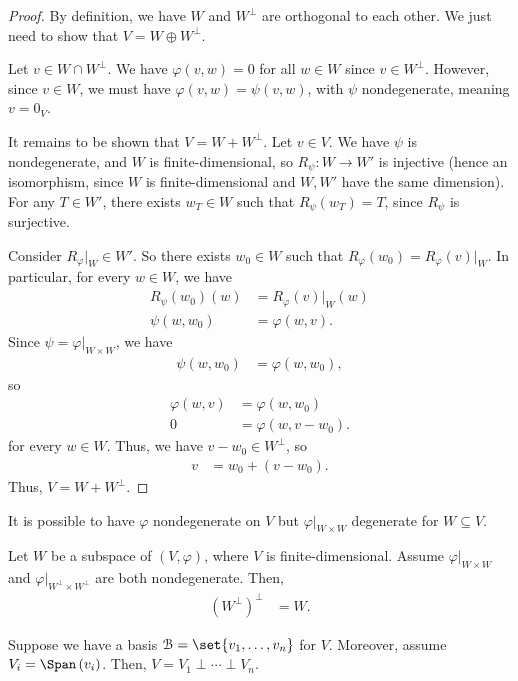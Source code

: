 \documentclass[10pt]{mypackage}
\begin{document}
  \begin{proof}
    By definition, we have $W$ and $W^{\perp}$ are orthogonal to each other. We just need to show that $V = W \oplus W^{\perp}$.\newline

    Let $v\in W\cap W^{\perp}$. We have $\varphi\left(v,w\right) = 0$ for all $w\in W$ since $v\in W^{\perp}$. However, since $v\in W$, we must have $\varphi\left(v,w\right) = \psi\left(v,w\right)$, with $\psi$ nondegenerate, meaning $v = 0_{V}$.\newline

    It remains to be shown that $V = W + W^{\perp}$. Let $v\in V$. We have $\psi$ is nondegenerate, and $W$ is finite-dimensional, so $R_{\psi}:W\rightarrow W'$ is injective (hence an isomorphism, since $W$ is finite-dimensional and $W,W'$ have the same dimension). For any $T\in W'$, there exists $w_T\in W$ such that $R_{\psi}\left(w_{T}\right) = T$, since $R_{\psi}$ is surjective.\newline

    Consider $R_{\varphi}|_{W} \in W'$. So there exists $w_{0}\in W$ such that $R_{\varphi}\left(w_0\right) = R_{\varphi}\left(v\right)|_{W}$. In particular, for every $w\in W$, we have
    \begin{align*}
      R_{\psi}\left(w_0\right)\left(w\right) &= R_{\varphi}\left(v\right)\bigr|_{W}\left(w\right)\\
      \psi\left(w,w_0\right) &= \varphi\left(w,v\right).
    \end{align*}
    Since $\psi = \varphi|_{W\times W}$, we have
    \begin{align*}
      \psi\left(w,w_0\right) &= \varphi\left(w,w_0\right),
    \end{align*}
    so
    \begin{align*}
      \varphi\left(w,v\right) &= \varphi\left(w,w_0\right)\\
      0 &= \varphi\left(w,v-w_0\right).
    \end{align*}
    for every $w\in W$. Thus, we have $v - w_0 \in W^{\perp}$, so
    \begin{align*}
      v &= w_0 + \left(v-w_0\right).
    \end{align*}
    Thus, $V = W + W^{\perp}$.
  \end{proof}
  It is possible to have $\varphi$ nondegenerate on $V$ but $\varphi|_{W\times W}$ degenerate for $W\subseteq V$.
  \begin{lemma}
    Let $W$ be a subspace of $\left(V,\varphi\right)$, where $V$ is finite-dimensional. Assume $\varphi|_{W\times W}$ and $\varphi|_{W^{\perp}\times W^{\perp}}$ are both nondegenerate. Then,
    \begin{align*}
      \left(W^{\perp}\right)^{\perp} &= W.
    \end{align*}
  \end{lemma}
  Suppose we have a basis $\mathcal{B} = \set{v_1,\dots,v_n}$ for $V$. Moreover, assume $V_i = \Span\left(v_i\right)$. Then, $V = V_1\perp\cdots\perp V_n$.\newline
\end{document}
